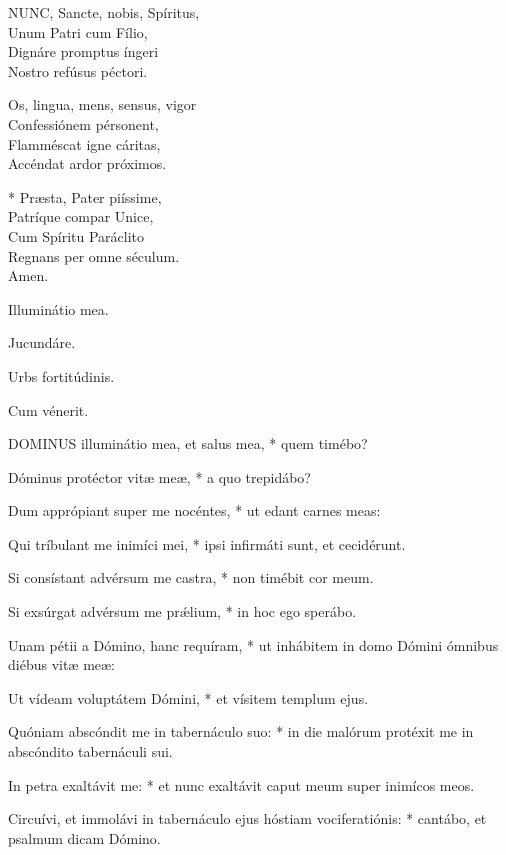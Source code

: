 \lettrine[lines=2]{N}{UNC}, Sancte, nobis, Spíritus,\\
Unum Patri cum Fílio,\\
Dignáre promptus íngeri\\
Nostro refúsus péctori.

Os, lingua, mens, sensus, vigor\\
Confessiónem pérsonent,\\
Flamméscat igne cáritas,\\
Accéndat ardor próximos.

* Præsta, Pater piíssime,\\
Patríque compar Unice,\\
Cum Spíritu Paráclito\\
Regnans per omne séculum.\\
Amen.

  Illuminátio mea.


  Jucundáre.

  Urbs fortitúdinis.

  Cum vénerit.


\lettrine[lines=2]{D}{OMINUS} illuminátio mea, et salus mea, * quem timébo?

Dóminus protéctor vitæ meæ, * a quo trepidábo?

Dum apprópiant super me nocéntes, * ut edant carnes meas:

Qui tríbulant me inimíci mei, * ipsi infirmáti sunt, et cecidérunt.

Si consístant advérsum me castra, * non timébit cor meum.

Si exsúrgat advérsum me prǽlium, * in hoc ego sperábo.

Unam pétii a Dómino, hanc requíram, * ut inhábitem in domo Dómini ómnibus diébus vitæ meæ:

Ut vídeam voluptátem Dómini, * et vísitem templum ejus.

Quóniam abscóndit me in tabernáculo suo: * in die malórum protéxit me in abscóndito tabernáculi sui.

In petra exaltávit me: * et nunc exaltávit caput meum super inimícos meos.

Circuívi, et immolávi in tabernáculo ejus hóstiam vociferatiónis: * cantábo, et psalmum dicam Dómino.

